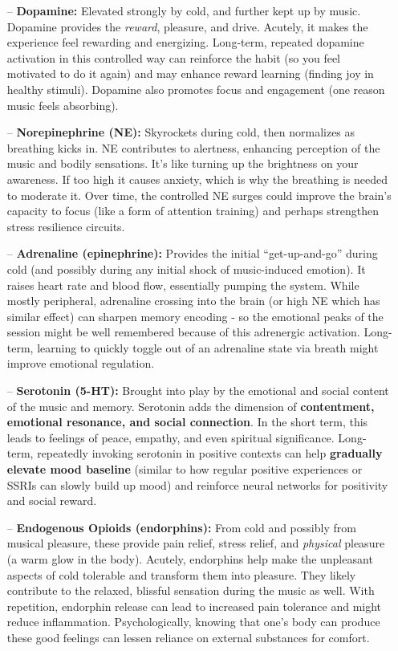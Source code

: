 \documentclass[11pt]{article}
\newcommand{\quotes}[1]{``#1''}
\begin{document}
\begin{itemize}
	\item[--] \textbf{Dopamine:} Elevated strongly by cold, and further kept up by music. Dopamine provides the \textit{reward}, pleasure, and drive. Acutely, it makes the experience feel rewarding and energizing. Long-term, repeated dopamine activation in this controlled way can reinforce the habit (so you feel motivated to do it again) and may enhance reward learning (finding joy in healthy stimuli). Dopamine also promotes focus and engagement (one reason music feels absorbing).
	\item[--] \textbf{Norepinephrine (NE):} Skyrockets during cold, then normalizes as breathing kicks in. NE contributes to alertness, enhancing perception of the music and bodily sensations. It's like turning up the brightness on your awareness. If too high it causes anxiety, which is why the breathing is needed to moderate it. Over time, the controlled NE surges could improve the brain's capacity to focus (like a form of attention training) and perhaps strengthen stress resilience circuits.
	\item[--] \textbf{Adrenaline (epinephrine):} Provides the initial \quotes{get-up-and-go} during cold (and possibly during any initial shock of music-induced emotion). It raises heart rate and blood flow, essentially pumping the system. While mostly peripheral, adrenaline crossing into the brain (or high NE which has similar effect) can sharpen memory encoding - so the emotional peaks of the session might be well remembered because of this adrenergic activation. Long-term, learning to quickly toggle out of an adrenaline state via breath might improve emotional regulation.
	\item[--] \textbf{Serotonin (5-HT):} Brought into play by the emotional and social content of the music and memory. Serotonin adds the dimension of \textbf{contentment, emotional resonance, and social connection}. In the short term, this leads to feelings of peace, empathy, and even spiritual significance. Long-term, repeatedly invoking serotonin in positive contexts can help \textbf{gradually elevate mood baseline} (similar to how regular positive experiences or SSRIs can slowly build up mood) and reinforce neural networks for positivity and social reward.
	\item[--] \textbf{Endogenous Opioids (endorphins):} From cold and possibly from musical pleasure, these provide pain relief, stress relief, and \textit{physical} pleasure (a warm glow in the body). Acutely, endorphins help make the unpleasant aspects of cold tolerable and transform them into pleasure. They likely contribute to the relaxed, blissful sensation during the music as well. With repetition, endorphin release can lead to increased pain tolerance and might reduce inflammation. Psychologically, knowing that one's body can produce these good feelings can lessen reliance on external substances for comfort.

\end{itemize}
\end{document}
